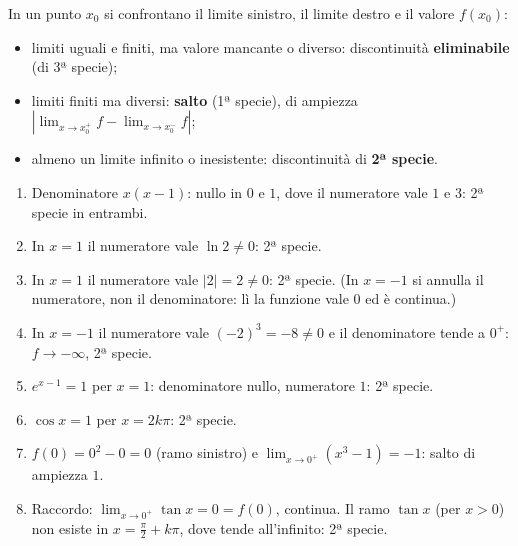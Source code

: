 \begin{question}[ID=2.6, subtitle={Punti singolari — serie 6}, tags={continuità, punti singolari}, difficulty=media]
\begin{explanation}
In un punto $x_0$ si confrontano il limite sinistro, il limite destro e il valore $f(x_0)$:
\begin{itemize}
    \item limiti uguali e finiti, ma valore mancante o diverso: discontinuità \textbf{eliminabile} (di 3ª specie);
    \item limiti finiti ma diversi: \textbf{salto} (1ª specie), di ampiezza $|\lim_{x\to x_0^+}f-\lim_{x\to x_0^-}f|$;
    \item almeno un limite infinito o inesistente: discontinuità di \textbf{2ª specie}.
\end{itemize}
\begin{enumerate}[label=\arabic*)]
    \item Denominatore $x(x-1)$: nullo in $0$ e $1$, dove il numeratore vale $1$ e $3$: 2ª specie in entrambi.
    \item In $x=1$ il numeratore vale $\ln2\neq0$: 2ª specie.
    \item In $x=1$ il numeratore vale $|2|=2\neq0$: 2ª specie. (In $x=-1$ si annulla il numeratore, non il denominatore: lì la funzione vale $0$ ed è continua.)
    \item In $x=-1$ il numeratore vale $(-2)^3=-8\neq0$ e il denominatore tende a $0^+$: $f\to-\infty$, 2ª specie.
    \item $e^{x-1}=1$ per $x=1$: denominatore nullo, numeratore $1$: 2ª specie.
    \item $\cos x=1$ per $x=2k\pi$: 2ª specie.
    \item $f(0)=0^2-0=0$ (ramo sinistro) e $\displaystyle\lim_{x\to0^+}(x^3-1)=-1$: salto di ampiezza $1$.
    \item Raccordo: $\displaystyle\lim_{x\to0^+}\tan x=0=f(0)$, continua. Il ramo $\tan x$ (per $x>0$) non esiste in $x=\tfrac\pi2+k\pi$, dove tende all'infinito: 2ª specie.
\end{enumerate}
\end{explanation}
\end{question}


